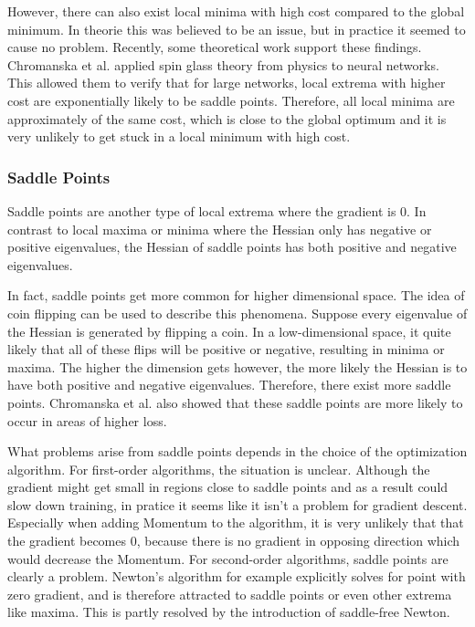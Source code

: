 However, there can also exist local minima with high cost compared to the global
minimum. In theorie this was believed to be an issue, but in practice it seemed
to cause no problem. Recently, some theoretical work support these findings.
Chromanska et al. \cite{choromanska2015loss} applied spin glass theory from
physics to neural networks. This allowed them to verify that for large networks,
local extrema with higher cost are exponentially likely to be saddle points.
Therefore, all local minima are approximately of the same cost, which is close
to the global optimum and it is very unlikely to get stuck in a local minimum
with high cost.

\subsubsection{Saddle Points}\label{prob:3}
Saddle points are another type of local extrema where the gradient is 0. In
contrast to local maxima or minima where the Hessian only has negative or
positive eigenvalues, the Hessian of saddle points has both positive and
negative eigenvalues.

In fact, saddle points get more common for higher dimensional space. The idea of
coin flipping can be used to describe this phenomena. Suppose every eigenvalue
of the Hessian is generated by flipping a coin. In a low-dimensional space, it
quite likely that all of these flips will be positive or negative, resulting in
minima or maxima. The higher the dimension gets however, the more likely the
Hessian is to have both positive and negative eigenvalues. Therefore, there
exist more saddle points. Chromanska et al. \cite{choromanska2015loss} also
showed that these saddle points are more likely to occur in areas of higher
loss.

What problems arise from saddle points depends in the choice of the optimization
algorithm. For first-order algorithms, the situation is unclear. Although the
gradient might get small in regions close to saddle points and as a result could
slow down training, in pratice it seems like it isn't a problem for gradient
descent. Especially when adding Momentum to the algorithm, it is very unlikely
that that the gradient becomes 0, because there is no gradient in opposing
direction which would decrease the Momentum. For second-order algorithms, saddle
points are clearly a problem. Newton's algorithm for example explicitly solves
for point with zero gradient, and is therefore attracted to saddle points or
even other extrema like maxima. This is partly resolved by the introduction of
saddle-free Newton. 


